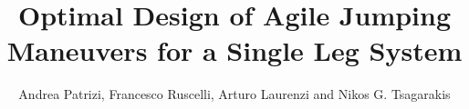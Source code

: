 \documentclass[aspectratio=169]{beamer}
\title{\vspace{0.5cm}\Large Optimal Design of Agile Jumping Maneuvers for a Single Leg System}
\subtitle{\small  Andrea Patrizi, Francesco Ruscelli, Arturo Laurenzi and Nikos G. Tsagarakis \vspace{1cm}}
\institute{Istituto Italiano di Tecnologia}
\begin{document}
\titleframe




%

\end{document}

